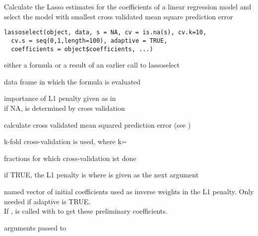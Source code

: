 \documentclass{article}
\begin{document}
\begin{Description}\relax
Calculate the Lasso estimates for the coefficients of a linear
regression model and select the model with smallest cross validated
mean square prediction error
\end{Description}
\begin{Usage}
\begin{verbatim}
lassoselect(object, data, s = NA, cv = is.na(s), cv.k=10,
  cv.s = seq(0,1,length=100), adaptive = TRUE,
  coefficients = object$coefficients, ...)
\end{verbatim}
\end{Usage}
\begin{Arguments}
\begin{ldescription}
\item[\code{object}] either a formula or a result of an earlier call to lassoselect
\item[\code{data}] data frame in which the formula is evaluated
\item[\code{s}] importance of L1 penalty given as in
\\
if NA,  is determined by cross validation
\item[\code{cv}] calculate cross validated mean squared prediction error
(see   )
\item[\code{cv.k}] k-fold cross-validation is used, where k=
\item[\code{cv.s}] fractions for which cross-validation ist done
\item[\code{adaptive}] if TRUE, the L1 penalty is 
where    is given as the next argument
\item[\code{coefficients}] named vector of initial coefficients used as
inverse weights in the L1 penalty. Only needed if adaptive is
TRUE.\\If {},  is called with
 to get these preliminary coefficients.

\item[\code{...}] arguments passed to  
\end{ldescription}
\end{Arguments}
\end{document}
